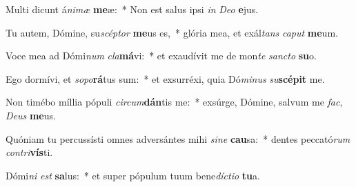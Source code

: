 \item Multi dicunt á\textit{ni}\textit{mæ} \textbf{me}æ:~* Non est salus ipsi \textit{in} \textit{De}\textit{o} \textbf{e}jus.
\item Tu autem, Dómine, su\textit{scép}\textit{tor} \textbf{me}us es,~* glória mea, et exál\textit{tans} \textit{ca}\textit{put} \textbf{me}um.
\item Voce mea ad Dómi\textit{num} \textit{cla}\textbf{má}vi:~* et exaudívit me de mon\textit{te} \textit{sanc}\textit{to} \textbf{su}o.
\item Ego dormívi, et \textit{so}\textit{po}\textbf{rá}tus sum:~* et exsurréxi, quia Dó\textit{mi}\textit{nus} \textit{su}\textbf{scé}\textbf{pit} me.
\item Non timébo míllia pópuli \textit{cir}\textit{cum}\textbf{dán}tis me:~* exsúrge, Dómine, salvum me \textit{fac}, \textit{De}\textit{us} \textbf{me}us.
\item Quóniam tu percussísti omnes adversántes mihi \textit{si}\textit{ne} \textbf{cau}sa:~* dentes peccató\textit{rum} \textit{con}\textit{tri}\textbf{vís}ti.
\item Dómi\textit{ni} \textit{est} \textbf{sa}lus:~* et super pópulum tuum bene\textit{díc}\textit{ti}\textit{o} \textbf{tu}a.
